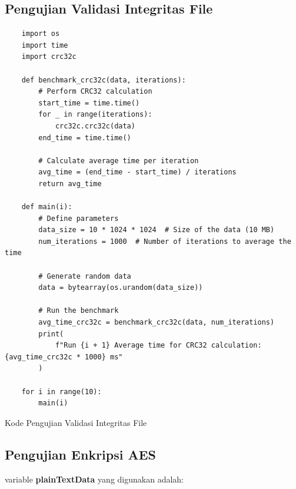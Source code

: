 \subsection{Pengujian Validasi Integritas File}
\begin{listing}[H]
    \begin{verbatim}
    import os
    import time
    import crc32c

    def benchmark_crc32c(data, iterations):
        # Perform CRC32 calculation
        start_time = time.time()
        for _ in range(iterations):
            crc32c.crc32c(data)
        end_time = time.time()

        # Calculate average time per iteration
        avg_time = (end_time - start_time) / iterations
        return avg_time

    def main(i):
        # Define parameters
        data_size = 10 * 1024 * 1024  # Size of the data (10 MB)
        num_iterations = 1000  # Number of iterations to average the time

        # Generate random data
        data = bytearray(os.urandom(data_size))

        # Run the benchmark
        avg_time_crc32c = benchmark_crc32c(data, num_iterations)
        print(
            f"Run {i + 1} Average time for CRC32 calculation: {avg_time_crc32c * 1000} ms"
        )

    for i in range(10):
        main(i)

    \end{verbatim}
    \caption{Kode Pengujian Validasi Integritas File}
    \label{code:kode_pengujian_validasi_integritas_file}
\end{listing}

\subsection{Pengujian Enkripsi AES}

variable \textbf{plainTextData} yang digunakan adalah:

